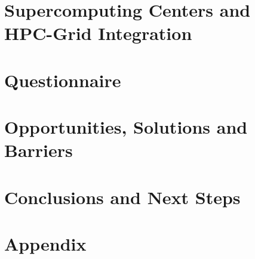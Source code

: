 \documentclass{../style/sig-alternate}
\begin{document}
\section{Supercomputing Centers and \\ HPC-Grid Integration}
\label{sec:supercomputercenters}


\section{Questionnaire} 
\label{sec:questionnaire}


\section{Opportunities, Solutions and\\ Barriers} 

\label{sec:opportunities}

\section{Conclusions and Next Steps}

\label{sec:conclusion}

%
%

%

%

\section*{Appendix}
\label{Appendix}

\end{document}
